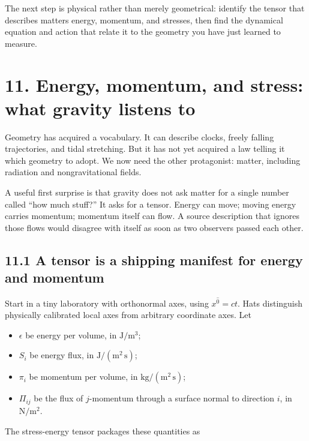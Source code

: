 \documentclass[
  11pt,
  letterpaper,
  oneside,
  openany]{scrbook}
\providecommand{\tightlist}{%
  \setlength{\itemsep}{0pt}\setlength{\parskip}{0pt}}
\begin{document}
\endgroup

The next step is physical rather than merely geometrical: identify the
tensor that describes matter\textquotesingle s energy, momentum, and
stresses, then find the dynamical equation and action that relate it to
the geometry you have just learned to measure.

\hypertarget{chapter-11}{%
\chapter{11. Energy, momentum, and stress: what gravity listens
to}\label{chapter-11}}

Geometry has acquired a vocabulary. It can describe clocks, freely
falling trajectories, and tidal stretching. But it has not yet acquired
a law telling it which geometry to adopt. We now need the other
protagonist: matter, including radiation and nongravitational fields.

A useful first surprise is that gravity does not ask matter for a single
number called ``how much stuff?'' It asks for a tensor. Energy can move;
moving energy carries momentum; momentum itself can flow. A source
description that ignores those flows would disagree with itself as soon
as two observers passed each other.

\hypertarget{a-tensor-is-a-shipping-manifest-for-energy-and-momentum}{%
\section{11.1 A tensor is a shipping manifest for energy and
momentum}\label{a-tensor-is-a-shipping-manifest-for-energy-and-momentum}}

Start in a tiny laboratory with orthonormal axes, using
\(x^{\hat 0}=ct\). Hats distinguish physically calibrated local axes
from arbitrary coordinate axes. Let

\begin{itemize}
\tightlist
\item
  \(\epsilon\) be energy per volume, in \(\mathrm{J/m^3}\);
\item
  \(S_i\) be energy flux, in \(\mathrm{J/(m^2\,s)}\);
\item
  \(\pi_i\) be momentum per volume, in \(\mathrm{kg/(m^2\,s)}\);
\item
  \(\Pi_{ij}\) be the flux of \(j\)-momentum through a surface normal to
  direction \(i\), in \(\mathrm{N/m^2}\).
\end{itemize}

The stress-energy tensor packages these quantities as
\end{document}
